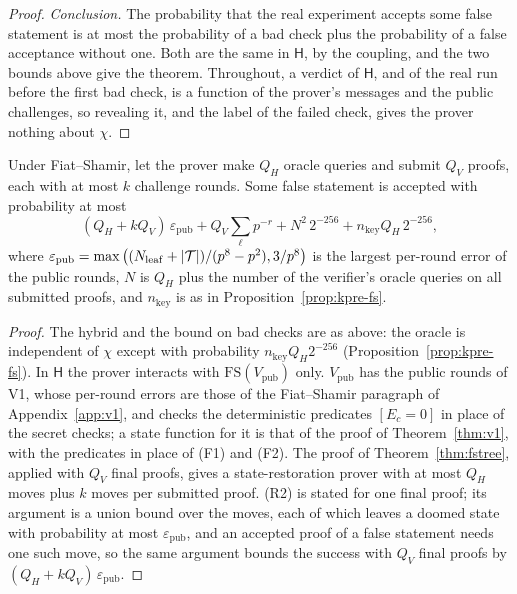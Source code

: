 \begin{proof}
\emph{Conclusion.} The probability that the real experiment accepts some false statement is at most
the probability of a bad check plus the probability of a false acceptance without one. Both are the
same in $\mathsf H$, by the coupling, and the two bounds above give the theorem. Throughout, a verdict
of $\mathsf H$, and of the real run before the first bad check, is a function of the prover's
messages and the public challenges, so revealing it, and the label of the failed check, gives the
prover nothing about $\chi$.
\end{proof}

\begin{corollary}
\label{cor:v1kpre-fs}
Under Fiat--Shamir, let the prover make $Q_H$ oracle queries and submit $Q_V$ proofs, each with at
most $k$ challenge rounds. Some false statement is accepted with probability at most
\[
  (Q_H+kQ_V)\,\varepsilon_{\mathrm{pub}}+Q_V\sum_\ell p^{-r}+N^2\,2^{-256}+n_{\mathrm{key}}Q_H\,2^{-256},
\]
where $\varepsilon_{\mathrm{pub}}=\max\big((N_{\mathrm{leaf}}+|\mathcal{T}|)/(p^8-p^2),3/p^8\big)$ is the largest
per-round error of the public rounds, $N$ is $Q_H$ plus the number of the verifier's oracle queries
on all submitted proofs, and $n_{\mathrm{key}}$ is as in Proposition~\ref{prop:kpre-fs}.
\end{corollary}

\begin{proof}
The hybrid and the bound on bad checks are as above: the oracle is independent of $\chi$ except with
probability $n_{\mathrm{key}}Q_H2^{-256}$ (Proposition~\ref{prop:kpre-fs}). In $\mathsf H$ the prover
interacts with $\mathrm{FS}(V_{\mathrm{pub}})$ only. $V_{\mathrm{pub}}$ has the public rounds of V1,
whose per-round errors are those of the Fiat--Shamir paragraph of Appendix~\ref{app:v1}, and checks
the deterministic predicates $[E_c=0]$ in place of the secret checks; a state function for it is that
of the proof of Theorem~\ref{thm:v1}, with the predicates in place of (F1) and (F2). The proof of
Theorem~\ref{thm:fstree}, applied with $Q_V$ final proofs, gives a state-restoration prover with at
most $Q_H$ moves plus $k$ moves per submitted proof. (R2) is stated for one final proof; its argument
is a union bound over the moves, each of which leaves a doomed state with probability at most
$\varepsilon_{\mathrm{pub}}$, and an accepted proof of a false statement needs one such move, so the
same argument bounds the success with $Q_V$ final proofs by $(Q_H+kQ_V)\,\varepsilon_{\mathrm{pub}}$.
\end{proof}

